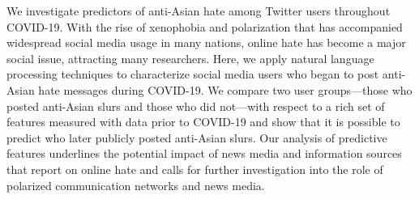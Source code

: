 We investigate predictors of anti-Asian hate among Twitter users throughout COVID-19. With the rise of xenophobia and polarization that has accompanied widespread social media usage in many nations, online hate has become a major social issue, attracting many researchers. Here, we apply natural language processing techniques to characterize social media users who began to post anti-Asian hate messages during COVID-19. We compare two user groups—those who posted anti-Asian slurs and those who did not—with respect to a rich set of features measured with data prior to COVID-19 and show that it is possible to predict who later publicly posted anti-Asian slurs. Our analysis of predictive features underlines the potential impact of news media and information sources that report on online hate and calls for further investigation into the role of polarized communication networks and news media.
